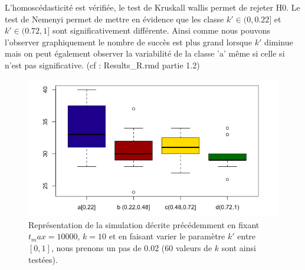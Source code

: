 \documentclass[12pt]{article}
\begin{document}
\begin{minipage}{0.5\textwidth}
L'homoscédasticité est vérifiée, le test de Kruskall wallis permet de rejeter H0. Le test de Nemenyi permet de mettre en évidence que les classe $k' \in(0,0.22 ] $ et $k'\in (0.72,1]$ sont significativement différente. Ainsi comme nous pouvons l'observer graphiquement le nombre de succès est plus grand lorsque $k'$ diminue mais on peut également observer la variabilité de la classe 'a' même si celle si n'est pas significative. (cf : Results\_R.rmd partie 1.2)
\end{minipage} \hfill
\begin{minipage}{0.45\textwidth}
\begin{figure}[H]
\includegraphics[width=1\textwidth]{NombreSuccesKp_F.png}
\caption{Représentation de la simulation décrite précédemment en fixant $t_max=10000$, $k=10$ et en faisant varier le paramètre $k'$ entre $[0,1]$, nous prenons un pas de 0.02 (60 valeurs de $k$ sont ainsi testées). }
\label{nbSkpF}
\end{figure}
\end{minipage}
\end{document}
